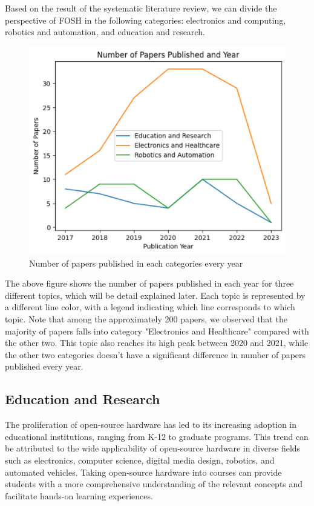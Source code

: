 \documentclass[final-report.tex]{subfiles}
\begin{document}
Based on the result of the systematic literature review, we can divide the perspective of FOSH in the following categories: electronics and computing, robotics and automation, and education and research.

\begin{figure}[!h]
    \begin{minipage}{0.48\textwidth}
        \centering
        \includegraphics[width=\textwidth]{Images/num_paper_vs_year.png}
        \caption{Number of papers published in each categories every year}
        \label{fig:1}
    \end{minipage}
\end{figure}
The above figure shows the number of papers published in each year for three different topics, which will be detail explained later. Each topic is represented by a different line color, with a legend indicating which line corresponds to which topic. Note that among the approximately 200 papers, we observed that the majority of papers falls into category "Electronics and Healthcare" compared with the other two. This topic also reaches its high peak between 2020 and 2021, while the other two categories doesn't have a significant difference in number of papers published every year. 


\subsection{Education and Research}

The proliferation of open-source hardware has led to its increasing adoption in educational institutions, ranging from K-12 to graduate programs.\cite{martinez2017open}
This trend can be attributed to the wide applicability of open-source hardware in diverse fields such as electronics\cite{papazoglou2017openhardsim}, computer science, digital media design\cite{chen2021research}, robotics\cite{vrochidou2018open}, and automated vehicles\cite{nakamoto2019development}. 
Taking open-source hardware into courses can provide students with a more comprehensive understanding of the relevant concepts and facilitate hands-on learning experiences.\cite{chen2021research}
\end{document}
